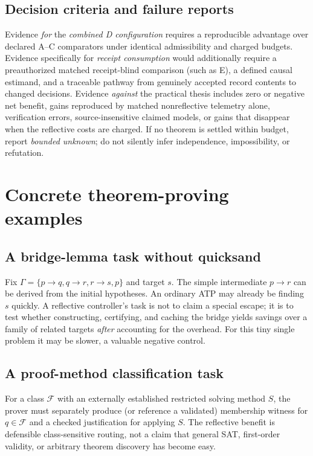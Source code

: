 \documentclass[11pt,letterpaper]{article}
\begin{document}
\subsection{Decision criteria and failure reports}
Evidence \emph{for} the \emph{combined D configuration} requires a reproducible advantage over declared A--C comparators under identical admissibility and charged budgets. Evidence specifically for \emph{receipt consumption} would additionally require a preauthorized matched receipt-blind comparison (such as E), a defined causal estimand, and a traceable pathway from genuinely accepted record contents to changed decisions. Evidence \emph{against} the practical thesis includes zero or negative net benefit, gains reproduced by matched nonreflective telemetry alone, verification errors, source-insensitive claimed models, or gains that disappear when the reflective costs are charged. If no theorem is settled within budget, report \emph{bounded unknown}; do not silently infer independence, impossibility, or refutation.

\section{Concrete theorem-proving examples}
\subsection{A bridge-lemma task without quicksand}
Fix $\Gamma=\{p\to q,q\to r,r\to s,p\}$ and target $s$. The simple intermediate $p\to r$ can be derived from the initial hypotheses. An ordinary ATP may already be finding $s$ quickly. A reflective controller's task is not to claim a special escape; it is to test whether constructing, certifying, and caching the bridge yields savings over a family of related targets \emph{after} accounting for the overhead. For this tiny single problem it may be slower, a valuable negative control.

\subsection{A proof-method classification task}
For a class $\mathcal F$ with an externally established restricted solving method $S$, the prover must separately produce (or reference a validated) membership witness for $q\in\mathcal F$ and a checked justification for applying $S$. The reflective benefit is defensible class-sensitive routing, not a claim that general SAT, first-order validity, or arbitrary theorem discovery has become easy.
\end{document}
